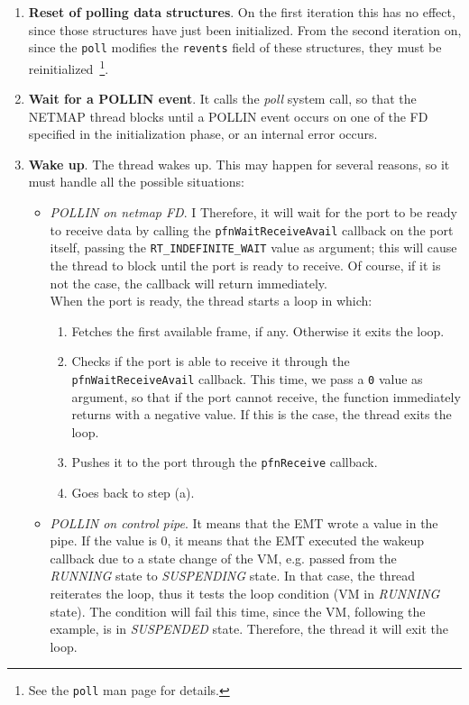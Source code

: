 \documentclass[a4paper, 12pt, titlepage]{report}
\begin{document}
\begin{enumerate}
\item \textbf{Reset of polling data structures}. On the first iteration this has no effect, since those structures have just been initialized. From the second iteration on, since the \texttt{poll} modifies the \texttt{revents} field of these structures, they must be reinitialized~\footnote{See the \texttt{poll} man page for details.}.
\item \textbf{Wait for a POLLIN event}. It calls the \textit{poll} system call, so that the NETMAP thread blocks until a POLLIN event occurs on one of the FD specified in the initialization phase, or an internal error occurs.
\item \textbf{Wake up}. The thread wakes up. This may happen for several reasons, so it must handle all the possible situations:
	\begin{itemize}
	\item \textit{POLLIN on netmap FD}. I%
	Therefore, it will wait for the port to be ready to receive data by calling the \texttt{pfnWaitReceiveAvail} callback on the port itself, passing the \texttt{RT\_INDEFINITE\_WAIT} value as argument; this will cause the thread to block until the port is ready to receive. Of course, if it is not the case, the callback will return immediately.
\\
When the port is ready, the thread starts a loop in which:
		\begin{enumerate}
		\item Fetches the first available frame, if any. Otherwise it exits the loop.
		\item Checks if the port is able to receive it through the \texttt{pfnWaitReceiveAvail} callback. This time, we pass a \texttt{0} value as argument, so that if the port cannot receive, the function immediately returns with a negative value. If this is the case, the thread exits the loop.
		\item Pushes it to the port through the \texttt{pfnReceive} callback.
		\item Goes back to step (a).
		\end{enumerate}
	\item \textit{POLLIN on control pipe}. It means that the EMT wrote a value in the pipe. If the value is 0, it means that the EMT executed the wakeup callback due to a state change of the VM, e.g. passed from the \textit{RUNNING} state to \textit{SUSPENDING} state. In that case, the thread reiterates the loop, thus it tests the loop condition (VM in \textit{RUNNING} state). The condition will fail this time, since the VM, following the example, is in \textit{SUSPENDED} state. Therefore, the thread it will exit the loop.

\end{itemize}
\end{enumerate}
\end{document}
